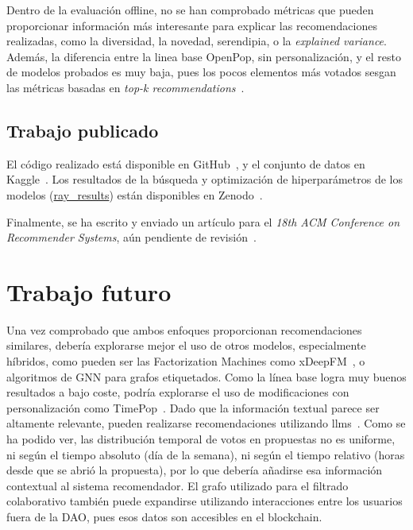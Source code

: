 Dentro de la evaluación offline, no se han comprobado métricas que pueden proporcionar información más interesante para explicar las recomendaciones realizadas, como la diversidad, la novedad, serendipia, o la \textit{explained variance}. Además, la diferencia entre la linea base OpenPop, sin personalización, y el resto de modelos probados es muy baja, pues los pocos elementos más votados sesgan las métricas basadas en \textit{top-k recommendations}~\cite{cremonesi_performance_2010}.

\subsection{Trabajo publicado}

El código realizado está disponible en GitHub~\cite{davo_daviddavoupm-tfm-notebooks_2024}, y el conjunto de datos en Kaggle~\cite{tfm-dataset-text}. Los resultados de la búsqueda y optimización de hiperparámetros de los modelos (\url{ray_results}) están disponibles en Zenodo~\cite{tfm-ray-results}.

Finalmente, se ha escrito y enviado un artículo para el \textit{18th ACM Conference on Recommender Systems}, aún pendiente de revisión~\cite{davo_enhancing_2024}.

\section{Trabajo futuro}

Una vez comprobado que ambos enfoques proporcionan recomendaciones similares, debería explorarse mejor el uso de otros modelos, especialmente híbridos, como pueden ser las Factorization Machines como xDeepFM~\cite{lian_xdeepfm_2018}, o algoritmos de GNN para grafos etiquetados. Como la línea base logra muy buenos resultados a bajo coste, podría explorarse el uso de modificaciones con personalización como TimePop~\cite{azzopardi_local_2019}. Dado que la información textual parece ser altamente relevante, pueden realizarse recomendaciones utilizando \glspl{llm}~\cite{li_pap-rec_2024}. Como se ha podido ver, las distribución temporal de votos en propuestas no es uniforme, ni según el tiempo absoluto (día de la semana), ni según el tiempo relativo (horas desde que se abrió la propuesta), por lo que debería añadirse esa información contextual al sistema recomendador. El grafo utilizado para el filtrado colaborativo también puede expandirse utilizando interacciones entre los usuarios fuera de la DAO, pues esos datos son accesibles en el blockchain.

